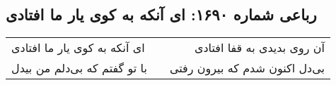 \begin{center}
\section*{رباعی شماره ۱۶۹۰: ای آنکه به کوی یار ما افتادی}
\label{sec:1690}
\begin{longtable}{l p{0.5cm} r}
ای آنکه به کوی یار ما افتادی
&&
آن روی بدیدی به قفا افتادی
\\
با تو گفتم که بی‌دلم من بیدل
&&
بی‌دل اکنون شدم که بیرون رفتی
\\
\end{longtable}
\end{center}
